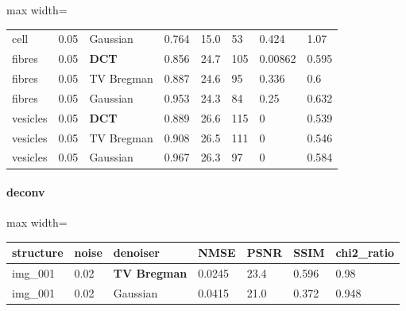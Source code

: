 \begin{center}
\begin{adjustbox}{max width=\linewidth}
\begin{tabular}{llllllll}
cell & 0.05 & Gaussian & 0.764 & 15.0 & 53 & 0.424 & 1.07 \\
fibres & 0.05 & \textbf{DCT} & 0.856 & 24.7 & 105 & 0.00862 & 0.595 \\
fibres & 0.05 & TV Bregman & 0.887 & 24.6 & 95 & 0.336 & 0.6 \\
fibres & 0.05 & Gaussian & 0.953 & 24.3 & 84 & 0.25 & 0.632 \\
vesicles & 0.05 & \textbf{DCT} & 0.889 & 26.6 & 115 & 0 & 0.539 \\
vesicles & 0.05 & TV Bregman & 0.908 & 26.5 & 111 & 0 & 0.546 \\
vesicles & 0.05 & Gaussian & 0.967 & 26.3 & 97 & 0 & 0.584 \\
\bottomrule
\end{tabular}\end{adjustbox}\end{center}
\paragraph{deconv}
\begin{center}\begin{adjustbox}{max width=\linewidth}
\begin{tabular}{lllllll}
\toprule
structure & noise & denoiser & NMSE & PSNR & SSIM & chi2\_ratio \\
\midrule
img\_001 & 0.02 & \textbf{TV Bregman} & 0.0245 & 23.4 & 0.596 & 0.98 \\
img\_001 & 0.02 & Gaussian & 0.0415 & 21.0 & 0.372 & 0.948 \\
\bottomrule
\end{tabular}\end{adjustbox}\end{center}

